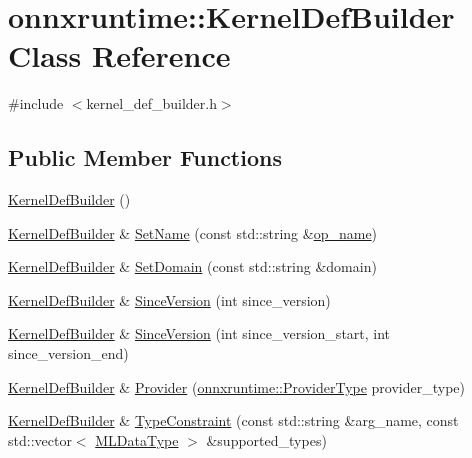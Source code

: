 \hypertarget{classonnxruntime_1_1KernelDefBuilder}{}\section{onnxruntime\+:\+:Kernel\+Def\+Builder Class Reference}
\label{classonnxruntime_1_1KernelDefBuilder}


{\ttfamily \#include $<$kernel\+\_\+def\+\_\+builder.\+h$>$}

\subsection*{Public Member Functions}
\begin{DoxyCompactItemize}
\item 
\mbox{\hyperlink{classonnxruntime_1_1KernelDefBuilder_aaeaaa7326473772ed8fa6dac82c8a0c6}{Kernel\+Def\+Builder}} ()
\item 
\mbox{\hyperlink{classonnxruntime_1_1KernelDefBuilder}{Kernel\+Def\+Builder}} \& \mbox{\hyperlink{classonnxruntime_1_1KernelDefBuilder_a48ebec00826acee0353169ba1a31be91}{Set\+Name}} (const std\+::string \&\mbox{\hyperlink{mkldnn_2nn_2pool_8cc_a3a7f1ca778ce6b4a22735e8b57736c04}{op\+\_\+name}})
\item 
\mbox{\hyperlink{classonnxruntime_1_1KernelDefBuilder}{Kernel\+Def\+Builder}} \& \mbox{\hyperlink{classonnxruntime_1_1KernelDefBuilder_af21211cd18ea345bd116de8b22347676}{Set\+Domain}} (const std\+::string \&domain)
\item 
\mbox{\hyperlink{classonnxruntime_1_1KernelDefBuilder}{Kernel\+Def\+Builder}} \& \mbox{\hyperlink{classonnxruntime_1_1KernelDefBuilder_ae0ddc824b271a1cb40f689f162049784}{Since\+Version}} (int since\+\_\+version)
\item 
\mbox{\hyperlink{classonnxruntime_1_1KernelDefBuilder}{Kernel\+Def\+Builder}} \& \mbox{\hyperlink{classonnxruntime_1_1KernelDefBuilder_a62f33b8471d08dd6d3c8acf086dc33a4}{Since\+Version}} (int since\+\_\+version\+\_\+start, int since\+\_\+version\+\_\+end)
\item 
\mbox{\hyperlink{classonnxruntime_1_1KernelDefBuilder}{Kernel\+Def\+Builder}} \& \mbox{\hyperlink{classonnxruntime_1_1KernelDefBuilder_a541928f5f11459f7356c76c981435dca}{Provider}} (\mbox{\hyperlink{namespaceonnxruntime_a863e2227cbf32aab76aad35fdadff4bb}{onnxruntime\+::\+Provider\+Type}} provider\+\_\+type)
\item 
\mbox{\hyperlink{classonnxruntime_1_1KernelDefBuilder}{Kernel\+Def\+Builder}} \& \mbox{\hyperlink{classonnxruntime_1_1KernelDefBuilder_aa0b8ea800fdf94fdb0bfac4695b75e9a}{Type\+Constraint}} (const std\+::string \&arg\+\_\+name, const std\+::vector$<$ \mbox{\hyperlink{namespaceonnxruntime_ad77d0a6e838ec7da5dc35fed5ee66b49}{M\+L\+Data\+Type}} $>$ \&supported\+\_\+types)

\end{DoxyCompactItemize}
